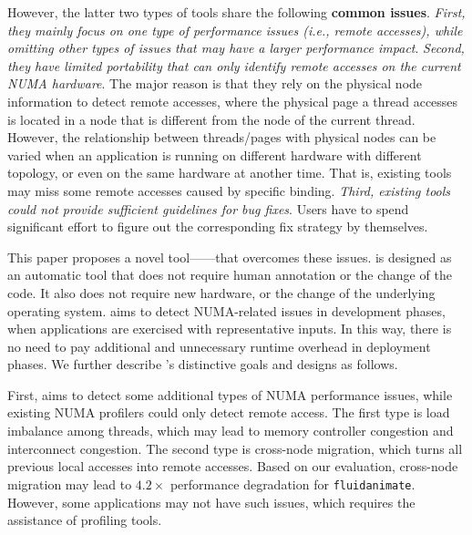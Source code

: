 However, the latter two types of tools share the following \textbf{common issues}. \textit{First, they mainly focus on one type of performance issues (i.e., remote accesses), while omitting other types of issues that may have a larger performance impact}. 
\textit{Second, they have limited portability that can only identify remote accesses on the current NUMA hardware}. The major reason is that they rely on the physical node information to detect remote accesses, where the physical page a thread accesses is located in a node that is different from the node of the current thread. However, 
the relationship between threads/pages with physical nodes can be varied when an application is running on different hardware with different topology, or even on the same hardware at another time. That is, existing tools may miss some remote accesses caused by specific binding. \textit{Third, existing tools could not provide sufficient guidelines for bug fixes}. Users have to spend significant effort to figure out the corresponding fix strategy by themselves. 




This paper proposes a novel tool---\NP{}---that overcomes these issues. \NP{} is designed as an automatic tool that does not require human annotation or the change of the code. It also does not require new hardware, or the change of the underlying operating system. \NP{} aims to detect NUMA-related issues in development phases, when applications are exercised with representative inputs. In this way, there is no need to pay additional and unnecessary runtime overhead in deployment phases. We further describe \NP{}'s distinctive goals and designs as follows. 

First, \NP{} aims to detect some additional types of NUMA performance issues, while existing NUMA profilers could only detect remote access. The first type is load imbalance among threads, which may lead to memory controller congestion and interconnect congestion. The second type is cross-node migration, which turns all previous local accesses into remote accesses. Based on our evaluation, cross-node migration may lead to $4.2\times$ performance degradation for \texttt{fluidanimate}. However, some applications may not have such issues, which requires the assistance of profiling tools.  

